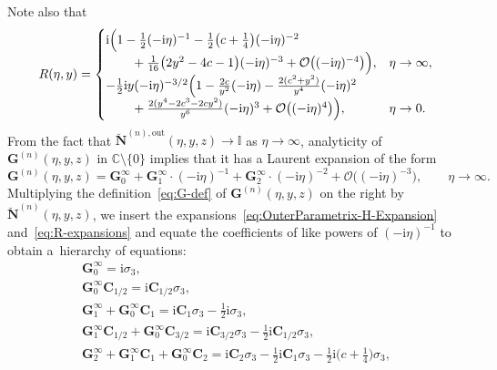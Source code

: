 \documentclass[pdftex]{sigma}
\numberwithin{equation}{section}
\begin{document}
Note also that
\begin{gather}
 R(\eta,y) =\begin{cases}
\mathrm{i} \Bigl(1-\tfrac{1}{2}(-\mathrm{i}\eta)^{-1} -\tfrac{1}{2}\bigl(c+\tfrac{1}{4}\bigr)(-\mathrm{i}\eta)^{-2} &\\
\qquad{} + \tfrac{1}{16}\bigl(2y^2-4c-1\bigr)(-\mathrm{i}\eta)^{-3} + \mathcal{O}\bigl((-\mathrm{i}\eta)^{-4}\bigr)\Bigr), &
\eta\to\infty, \\
-\tfrac{1}{2}\mathrm{i} y (-\mathrm{i}\eta)^{-3/2}\Bigl(1-\frac{2c}{y^2}(-\mathrm{i}\eta) -\frac{2(c^2+y^2)}{y^4}(-\mathrm{i}\eta)^2 &\\
\qquad{} +\frac{2(y^4-2c^3-2cy^2)}{y^6}(-\mathrm{i}\eta)^3+\mathcal{O}\bigl((-\mathrm{i}\eta)^{4}\bigr)\Bigr), &
\eta\to 0.
\end{cases}
\label{eq:R-expansions}
\end{gather}
From the fact that $\breve{\mathbf{N}}^{(n),\mathrm{out}}(\eta,y,z)\to\mathbb{I}$ as $\eta\to\infty$, analyticity of $\mathbf{G}^{(n)}(\eta,y,z)$ in $\mathbb{C}\setminus\{0\}$ implies that it has a Laurent expansion of the form
\begin{equation*}
\mathbf{G}^{(n)}(\eta,y,z)= \mathbf{G}^\infty_0 + \mathbf{G}^\infty_1\cdot (-\mathrm{i}\eta)^{-1} + \mathbf{G}^\infty_2\cdot(-\mathrm{i}\eta)^{-2} + \mathcal{O}\bigl((-\mathrm{i}\eta)^{-3}\bigr),\qquad\eta\to\infty.
\end{equation*}
Multiplying the definition~\eqref{eq:G-def} of $\mathbf{G}^{(n)}(\eta,y,z)$ on the right by $\breve{\mathbf{N}}^{(n)}(\eta,y,z)$, we insert the expansions~\eqref{eq:OuterParametrix-H-Expansion} and~\eqref{eq:R-expansions} and equate the coefficients of like powers of $(-\mathrm{i}\eta)^{-1}$ to obtain a~hierarchy of equations:
\begin{gather*}
\mathbf{G}^\infty_0=\mathrm{i}\sigma_3,
\\
\mathbf{G}^\infty_0\mathbf{C}_{1/2} = \mathrm{i}\mathbf{C}_{1/2}\sigma_3,
\\
\mathbf{G}^\infty_1+\mathbf{G}^\infty_0\mathbf{C}_1 = \mathrm{i}\mathbf{C}_1\sigma_3-\tfrac{1}{2}\mathrm{i}\sigma_3,
\\
\mathbf{G}^\infty_1\mathbf{C}_{1/2} +\mathbf{G}^\infty_0\mathbf{C}_{3/2}=\mathrm{i}\mathbf{C}_{3/2}\sigma_3-\tfrac{1}{2}\mathrm{i}\mathbf{C}_{1/2}\sigma_3,
\\
\mathbf{G}^\infty_2 + \mathbf{G}^\infty_1\mathbf{C}_1 + \mathbf{G}^\infty_0\mathbf{C}_2 = \mathrm{i}\mathbf{C}_2\sigma_3 -\tfrac{1}{2}\mathrm{i}\mathbf{C}_1\sigma_3-\tfrac{1}{2}\mathrm{i} \bigl(c+\tfrac{1}{4}\bigr)\sigma_3,
\end{gather*}
\end{document}
